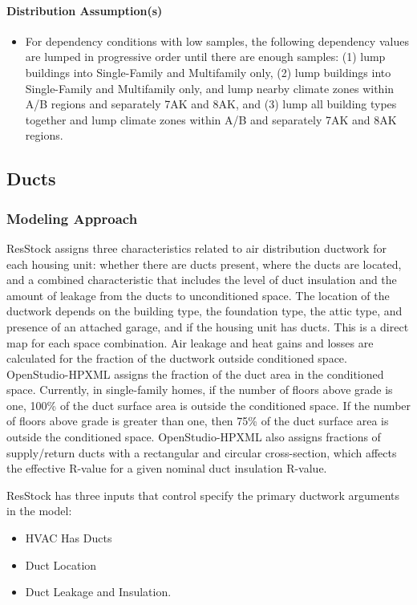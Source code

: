 \paragraph{Distribution Assumption(s)}
\begin{itemize}
    \item For dependency conditions with low samples, the following dependency values are lumped in progressive order until there are enough samples: (1) lump buildings into Single-Family and Multifamily only, (2) lump buildings into Single-Family and Multifamily only, and lump nearby climate zones within A/B regions and separately 7AK and 8AK, and (3) lump all building types together and lump climate zones within A/B and separately 7AK and 8AK regions.
\end{itemize}
 
\subsection{Ducts}
\subsubsection{Modeling Approach}
ResStock assigns three characteristics related to air distribution ductwork for each housing unit: whether there are ducts present, where the ducts are located, and a combined characteristic that includes the level of duct insulation and the amount of leakage from the ducts to unconditioned space. The location of the ductwork depends on the building type, the foundation type, the attic type, and presence of an attached garage, and if the housing unit has ducts. This is a direct map for each space combination. Air leakage and heat gains and losses are calculated for the fraction of the ductwork outside conditioned space. OpenStudio-HPXML assigns the fraction of the duct area in the conditioned space. Currently, in single-family homes, if the number of floors above grade is one, 100\% of the duct surface area is outside the conditioned space. If the number of floors above grade is greater than one, then 75\% of the duct surface area is outside the conditioned space. OpenStudio-HPXML also assigns fractions of supply/return ducts with a rectangular and circular cross-section, which affects the effective R-value for a given nominal duct insulation R-value.

ResStock has three inputs that control specify the primary ductwork arguments in the model:
\begin{itemize}
    \item HVAC Has Ducts
    \item Duct Location
    \item Duct Leakage and Insulation.
\end{itemize}

